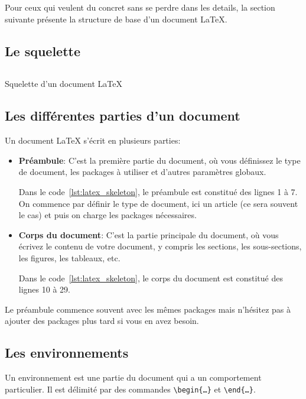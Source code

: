 Pour ceux qui veulent du concret sans se perdre dans les details,
la section suivante présente la structure de base d'un document LaTeX.

\subsection{Le squelette}\label{subsec:latex_skeleton}
\begin{listing}[H]
\inputminted[frame=single,framesep=4pt,breaklines]{latex}{./3_Structure/latex_skeleton.tex}
\caption{Squelette d'un document LaTeX}
\label{lst:latex_skeleton}
\end{listing}

\subsection{Les différentes parties d'un document}\label{subsec:latex_parts}

Un document LaTeX s'écrit en plusieurs parties:

\begin{itemize}
    \item \textbf{Préambule}: C'est la première partie du document, où vous définissez le type de document, les packages à utiliser et d'autres paramètres globaux.

    Dans le code~\ref{lst:latex_skeleton}, le préambule est constitué des lignes 1 à 7.
    On commence par définir le type de document, ici un article (ce sera souvent le cas)
    et puis on charge les packages nécessaires.

    \item \textbf{Corps du document}: C'est la partie principale du document, 
    où vous écrivez le contenu de votre document, y compris les sections, les sous-sections, 
    les figures, les tableaux, etc.

    Dans le code~\ref{lst:latex_skeleton}, le corps du document est constitué des lignes 10 à 29.
\end{itemize}

Le préambule commence souvent avec les mêmes packages mais 
n'hésitez pas à ajouter des packages plus tard si vous en avez besoin.

\subsection{Les environnements}\label{subsec:latex_environments}

Un environnement est une partie du document qui a un comportement particulier.
Il est délimité par des commandes \texttt{\textbackslash{}begin\{\ldots\}} et \texttt{\textbackslash{}end\{\ldots\}}.

